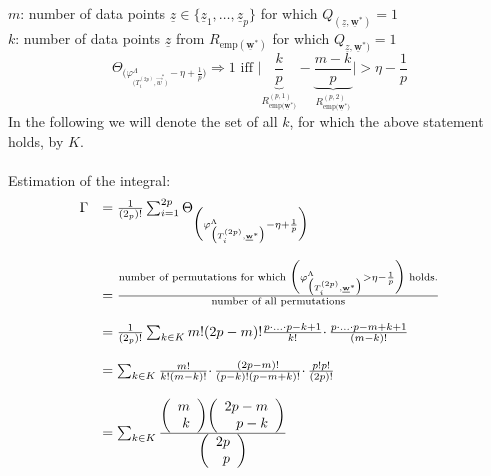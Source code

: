 $m$: number of data points $\underline{z} \in \big\{ \underline{z}_1, \ldots, \underline{z}_p \big\}$ for which $Q_{ ( \underline{z}, \mathbf{\underline{w}^* } ) } = 1$\\
$k$: number of data points $\underline{z}$ from $R_{ \mathrm{emp} (\mathbf{\underline{w}}^*)}$ for which $Q_{ \underline{z}, \mathbf{\underline{w}^* } ) } = 1$
\begin{equation}
	\Theta_{ \bigg( 
			\varphi_{ \big( T_i^{ (2p) }, \vec{w}^* 
			\big) }^\Lambda 
			- \eta + \frac{1}{p} \bigg) }
	\Rightarrow 1 \textrm{ iff } \Big| 
	\underbrace{ \frac{k}{p} }_{ R_{ \mathrm{emp} 
		( \mathbf{\underline{w}^*) } }^{ (p,1) } }
	-\underbrace{ \frac{m-k}{p} }_{ R_{ \mathrm{emp} 
		( \mathbf{\underline{w}^*) } }^{ (p,2) } } \Big|
	> \eta -\frac{1}{p}
\end{equation}
In the following we will denote the set of all $k$, for which the above statement holds, by $K$.\\\\
Estimation of the integral:
\begin{equation}
	\begin{array}{ll}
		\Gamma 
		& = \frac{1}{ ( 2_p ) \mathrm{!} } \sum_{ i = 1 }^{ 2p }
		  \Theta_{ \bigg( 
			\varphi_{ \big( T_i^{ (2p) }, \underline{\mathbf{w}}^* 
			\big) }^\Lambda 
			- \eta + \frac{1}{p} \bigg) } \\\\
		& = \frac{ \textrm{number of permutations for which }
			\bigg( \varphi_{ \big( T_i^{ (2p) }, 
				\underline{\mathbf{w}}^* \big) }^\Lambda 
			> \eta - \frac{1}{p} \bigg)
			\textrm{ holds.} }{ \textrm{number of all permutations}}
			\\\\
		& = \frac{1}{ ( 2_p ) \mathrm{!} } \sum_{ k \in K } 
			m\mathrm{!} (2p-m)\mathrm{!} 
			\frac{p \cdotp \ldots \cdotp p-k+1 }
				{k \mathrm{!}}
				\cdotp \frac{p \cdotp \ldots \cdotp p-m+k+1 }
				{(m-k) \mathrm{!}} \\\\
		& = \sum_{k \in K} \frac{ m\mathrm{!} }{ k\mathrm{!} 
			(m-k) \mathrm{!}} \cdotp \frac{(2p-m) \mathrm{!} }{
				(p-k) \mathrm{!} (p-m+k) \mathrm{!} }
			\cdotp \frac{p\mathrm{!}p\mathrm{!}}{
				(2p)\mathrm{!}} \\\\
		& = \sum_{k \in K} \frac{ \left( \begin{array}{rrrrrrrrrrrrrrrrrrrrrrrrrr} m\\k\\ \end{array} \right) \left( \begin{array}{rrrrrrrrrrrrrrrrrrrrrrrrrr} 2p-m\\p-k\\ \end{array} \right) }{
			\left( \begin{array}{rrrrrrrrrrrrrrrrrrrrrrrrrr} 2p\\p\\ \end{array} \right)}
	\end{array}
\end{equation}
